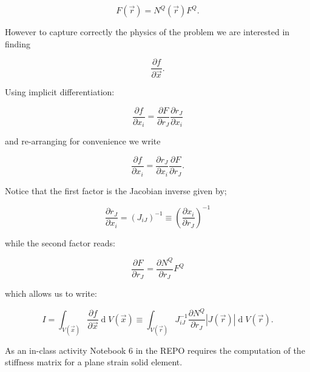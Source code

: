 \[F(\overrightarrow r)=N^Q(\overrightarrow r)F^Q.\]

However to capture correctly the physics of the problem we are interested in finding

\[\frac{\partial f}{\partial\overrightarrow x}.\]

Using implicit differentiation:

\[\frac{\partial f}{\partial x_i}=\frac{\partial F}{\partial r_J}\frac{\partial r_J}{\partial x_i}\]

and re-arranging for convenience we write

\begin{equation}
\frac{\partial f}{\partial x_i}=\frac{\displaystyle\partial r_J}{\displaystyle\partial x_i}\frac{\partial F}{\partial r_J}.
\end{equation}

Notice that the first factor is the Jacobian inverse given by;

\[\frac{\partial r_J}{\partial x_i}=\left(J_{iJ}\right)^{-1}\equiv\left(\frac{\displaystyle\partial x_i}{\displaystyle\partial r_J}\right)^{-1}\]

while the second factor reads:

\[\frac{\partial F}{\partial r_J}=\frac{\partial N^Q}{\partial r_J}F^Q\]

which allows us to write:

\[I=\int_{V(\overrightarrow x)}\frac{\partial f}{\partial\overrightarrow x}\operatorname d{V(\overrightarrow x)}\equiv\int_{V(\overrightarrow r)}J_{iJ}^{-1}\frac{\displaystyle\partial N^Q}{\displaystyle\partial r_J}\left|J(\overrightarrow r)\right|\operatorname dV(\overrightarrow r).\]


\begin{tcolorbox}
As an in-class activity Notebook 6 in the REPO requires the computation of the stiffness matrix for a plane strain solid element.
\end{tcolorbox}

